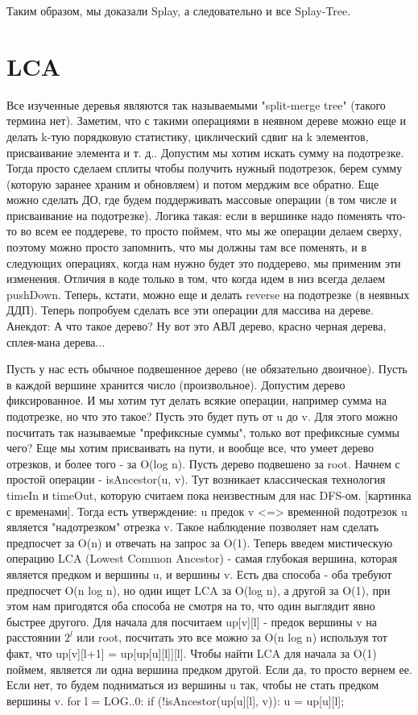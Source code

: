 Таким образом, мы доказали Splay, а следовательно и все Splay-Tree.



\section{LCA}




Все изученные деревья являются так называемыми "split-merge tree" (такого термина нет). Заметим, что с такими операциями в неявном дереве можно еще и делать k-тую порядковую статистику, циклический сдвиг на k элементов, присваивание элемента и т. д.. Допустим мы хотим искать сумму на подотрезке. Тогда просто сделаем сплиты чтобы получить нужный подотрезок, берем сумму (которую заранее храним и обновляем) и потом мерджим все обратно. Еще можно сделать ДО, где будем поддерживать массовые операции (в том числе и присваивание на подотрезке). Логика такая: если в вершинке надо поменять что-то во всем ее поддереве, то просто поймем, что мы же операции делаем сверху, поэтому можно просто запомнить, что мы должны там все поменять, и в следующих операциях, когда нам нужно будет это поддерево, мы применим эти изменения. Отличия в коде только в том, что когда идем в низ всегда делаем pushDown. Теперь, кстати, можно еще и делать reverse на подотрезке (в неявных ДДП).
Теперь попробуем сделать все эти операции для массива на дереве.
Анекдот: А что такое дерево? Ну вот это АВЛ дерево, красно черная дерева, сплея-мана дерева...

Пусть у нас есть обычное подвешенное дерево (не обязательно двоичное). Пусть в каждой вершине хранится число (произвольное). Допустим дерево фиксированное. И мы хотим тут делать всякие операции, например сумма на подотрезке, но что это такое? Пусть это будет путь от u до v. Для этого можно посчитать так называемые "префиксные суммы", только вот префиксные суммы чего? Еще мы хотим присваивать на пути, и вообще все, что умеет дерево отрезков, и более того - за O(log n). Пусть дерево подвешено за root. Начнем с простой операции - isAncestor(u, v). Тут возникает классическая технология timeIn и timeOut, которую считаем пока неизвестным для нас DFS-ом. [картинка с временами]. Тогда есть утверждение: u предок v <=> временной подотрезок u является "надотрезком" отрезка v. Такое наблюдение позволяет нам сделать предпосчет за O(n) и отвечать на запрос за O(1). 
Теперь введем мистическую операцию LCA (Lowest Common Ancestor) - самая глубокая вершина, которая является предком и вершины u, и вершины v. Есть два способа - оба требуют предпосчет O(n log n), но один ищет LCA за O(log n), а другой за O(1), при этом нам пригодятся оба способа не смотря на то, что один выглядит явно быстрее другого. Для начала для посчитаем up[v][l] - предок вершины v на расстоянии $2^l$ или root, посчитать это все можно за O(n log n) используя тот факт, что up[v][l+1] = up[up[u][l]][l]. 
Чтобы найти LCA для начала за O(1) поймем, является ли одна вершина предком другой. Если да, то просто вернем ее. Если нет, то будем подниматься из вершины u так, чтобы не стать предком вершины v. 
for l = LOG..0:
	if (!isAncestor(up[u][l], v)):
		u = up[u][l];


